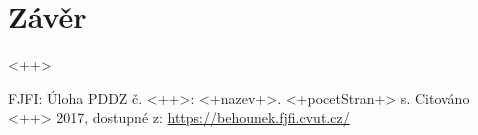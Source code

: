 \documentclass[11pt,a4paper]{article}
\begin{document}
\section{Závěr}
<++>
\begin{thebibliography}{Mm99}
 FJFI: Úloha PDDZ č. <++>: <+nazev+>. <+pocetStran+> s. Citováno <++> 2017, dostupné z: \url{https://behounek.fjfi.cvut.cz/}
\end{thebibliography}



\end{document}
